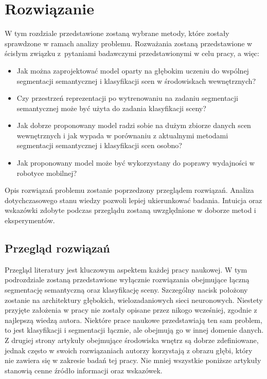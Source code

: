 \newpage %
\section{Rozwiązanie}

W tym rozdziale przedstawione zostaną wybrane metody, które zostały sprawdzone w ramach analizy problemu. Rozważania zostaną przedstawione w ścisłym związku z~pytaniami badawczymi przedstawionymi w celu pracy, a więc:

\begin{itemize}
    \item Jak można zaprojektować model oparty na głębokim uczeniu do wspólnej segmentacji semantycznej i klasyfikacji scen w środowiskach wewnętrznych?
    \item Czy przestrzeń reprezentacji po wytrenowaniu na zadaniu segmentacji semantycznej może być użyta do zadania klasyfikacji sceny?
    \item Jak dobrze proponowany model radzi sobie na dużym zbiorze danych scen wewnętrznych i jak wypada w porównaniu z aktualnymi metodami segmentacji semantycznej i klasyfikacji scen osobno?
    \item Jak proponowany model może być wykorzystany do poprawy wydajności w robotyce mobilnej?
\end{itemize}
Opis rozwiązań problemu zostanie poprzedzony przeglądem rozwiązań. Analiza dotychczasowego stanu wiedzy pozwoli lepiej ukierunkować badania. Intuicja oraz wskazówki zdobyte podczas przeglądu zostaną uwzględnione w doborze metod i eksperymentów.

\subsection{Przegląd rozwiązań}
Przegląd literatury jest kluczowym aspektem każdej pracy naukowej. W tym podrozdziale zostaną przedstawione wyłącznie rozwiązania obejmujące łączną segmentację semantyczną oraz klasyfikację sceny. Szczególny nacisk położony zostanie na architektury głębokich, wielozadaniowych sieci neuronowych. Niestety przyjęte założenia w pracy nie zostały opisane przez nikogo wcześniej, zgodnie z najlepszą wiedzą autora. Niektóre prace naukowe przedstawiają ten sam problem, to jest klasyfikacji i segmentacji łącznie, ale obejmują go w innej domenie danych. Z drugiej strony artykuły obejmujące środowiska wnętrz są dobrze zdefiniowane, jednak często w swoich rozwiązaniach autorzy korzystają z obrazu głębi, który nie zawiera się w zakresie badań tej pracy. Nie mniej wszystkie poniższe artykuły stanowią cenne źródło informacji oraz wskazówek.

